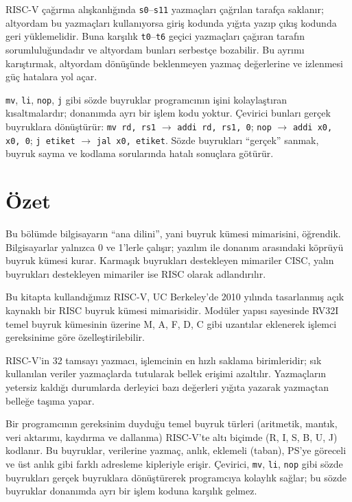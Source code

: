 RISC-V çağırma alışkanlığında \texttt{s0}--\texttt{s11} yazmaçları çağrılan tarafça saklanır; altyordam bu yazmaçları kullanıyorsa giriş kodunda yığıta yazıp çıkış kodunda geri yüklemelidir. Buna karşılık \texttt{t0}--\texttt{t6} geçici yazmaçları çağıran tarafın sorumluluğundadır ve altyordam bunları serbestçe bozabilir. Bu ayrımı karıştırmak, altyordam dönüşünde beklenmeyen yazmaç değerlerine ve izlenmesi güç hatalara yol açar.

\texttt{mv}, \texttt{li}, \texttt{nop}, \texttt{j} gibi sözde buyruklar programcının işini kolaylaştıran kısaltmalardır; donanımda ayrı bir işlem kodu yoktur. Çevirici bunları gerçek buyruklara dönüştürür: \texttt{mv rd, rs1} $\to$ \texttt{addi rd, rs1, 0}; \texttt{nop} $\to$ \texttt{addi x0, x0, 0}; \texttt{j etiket} $\to$ \texttt{jal x0, etiket}. Sözde buyrukları ``gerçek'' sanmak, buyruk sayma ve kodlama sorularında hatalı sonuçlara götürür.


\section{Özet}
\label{sec:bolum3-ozet}

Bu bölümde bilgisayarın ``ana dilini'', yani buyruk kümesi mimarisini, öğrendik. Bilgisayarlar yalnızca 0 ve 1'lerle çalışır; yazılım ile donanım arasındaki köprüyü buyruk kümesi kurar. Karmaşık buyrukları destekleyen mimariler CISC, yalın buyrukları destekleyen mimariler ise RISC olarak adlandırılır.

Bu kitapta kullandığımız RISC-V, UC Berkeley'de 2010 yılında tasarlanmış açık kaynaklı bir RISC buyruk kümesi mimarisidir. Modüler yapısı sayesinde RV32I temel buyruk kümesinin üzerine M, A, F, D, C gibi uzantılar eklenerek işlemci gereksinime göre özelleştirilebilir.

RISC-V'in 32 tamsayı yazmacı, işlemcinin en hızlı saklama birimleridir; sık kullanılan veriler yazmaçlarda tutularak bellek erişimi azaltılır. Yazmaçların yetersiz kaldığı durumlarda derleyici bazı değerleri yığıta yazarak yazmaçtan belleğe taşıma yapar.

Bir programcının gereksinim duyduğu temel buyruk türleri (aritmetik, mantık, veri aktarımı, kaydırma ve dallanma) RISC-V'te altı biçimde (R, I, S, B, U, J) kodlanır. Bu buyruklar, verilerine yazmaç, anlık, eklemeli (taban), PS'ye göreceli ve üst anlık gibi farklı adresleme kipleriyle erişir. Çevirici, \texttt{mv}, \texttt{li}, \texttt{nop} gibi sözde buyrukları gerçek buyruklara dönüştürerek programcıya kolaylık sağlar; bu sözde buyruklar donanımda ayrı bir işlem koduna karşılık gelmez.

